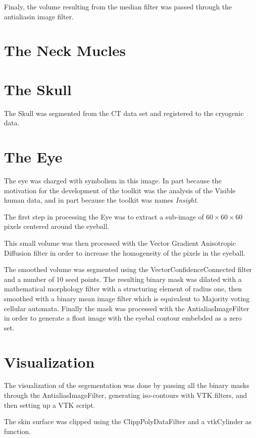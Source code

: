 Finaly, the volume resulting from the median filter was passed through the 
antialiasin image filter.


\section*{The Neck Mucles}

\section*{The Skull}
The Skull was segmented from the CT data set and registered to the cryogenic data.

\section*{The Eye} 
The eye was charged with symbolism in this image. In part because the
motivation for the development of the toolkit was the analysis of the Visible
human data, and in part because the toolkit was names \emph{Insight}.

The first step in processing the Eye was to extract a sub-image of
$60\times60\times60$ pixels centered around the eyeball.

This small volume was then processed with the Vector Gradient Anisotropic
Diffusion filter in order to increase the homogeneity of the pixels in the 
eyeball.

The smoothed volume was segmented using the VectorConfidenceConnected filter
and a number of 10 seed points. The resulting binary mask was dilated with 
a mathematical morphology filter with a structuring element of radius one, then
smoothed with a binary mean image filter which is equivalent to Majority voting
cellular automata. Finally the mask was processed with the AntialiasImageFilter
in order to generate a float image with the eyebal contour embebded as a zero
set.


\section*{Visualization}

The visualization of the segementation was done by passing all the binary 
masks through the AntialiasImageFilter, generating iso-contours with VTK
filters, and then setting up a VTK script.

The skin surface was clipped using the ClippPolyDataFilter and a vtkCylinder
as function.
